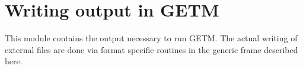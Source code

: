 \section{Writing output in GETM}

This module contains the output necessary to run GETM. The actual
writing of external files are done via format specific routines in the
generic frame described here.

